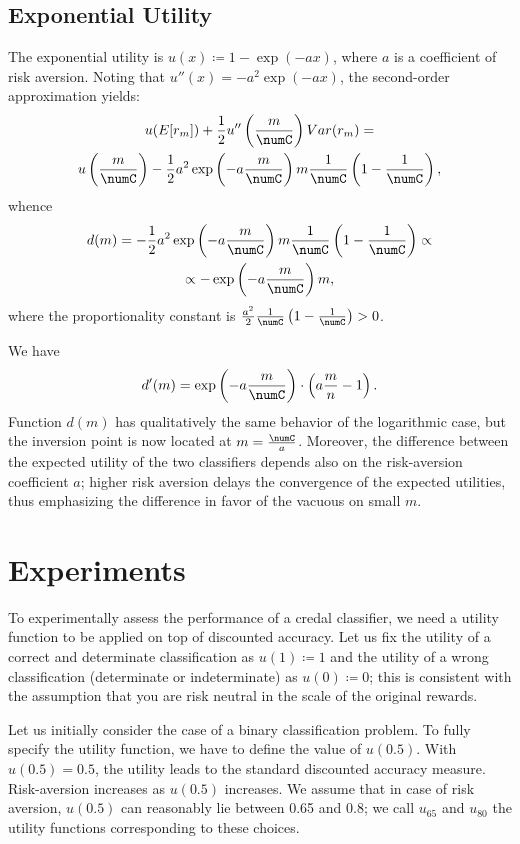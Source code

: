 \documentclass[a4paper,10pt,reqno]{amsart}
\theoremstyle{remark}
\begin{document}
\subsection{Exponential Utility}

The exponential utility is $u(x)\coloneqq 1-\exp(-ax)$, where $a$ is a coefficient of risk aversion. Noting that $u''(x)=-a^2\exp(-ax)$, the second-order approximation yields:
\begin{gather}
 u(E[r_m])+\frac{1}{2}
u''\left(\frac{m}{\numC}\right)Var(r_m)=\nonumber\\
u\left(\frac{m}{\numC}\right)-\frac{1}{2}a^2\exp\left(-a\frac{m}{\numC}\right)
m\frac{1}{\numC} \left(1-\frac{1}{\numC}\right),\notag
\end{gather}
whence
\begin{gather}
d(m)=-\frac{1}{2}a^2\exp\left(-a\frac{m}{\numC}\right)m\frac{1}{\numC}\left(1-\frac{1}{\numC}\right)\propto\nonumber\\
\propto-\exp\left(-a\frac{m}{\numC}\right)m,\notag
\end{gather}
where the proportionality constant is $\frac{a^2}{2}\frac{1}{\numC}\left(1-\frac{1}{\numC}\right)>0$.

We have
\begin{align}
d'(m)=\exp\left(-a\frac{m}{\numC}\right)\cdot \left( a\frac{m}{n}-1\right).\notag%
\end{align}
Function $d(m)$ has qualitatively the same behavior of the logarithmic case, but the inversion point is now located at $m=\frac{\numC}{a}$.
Moreover, the difference between the expected utility of the two classifiers depends also on the risk-aversion coefficient $a$; higher risk aversion delays the convergence of the expected utilities, thus emphasizing the difference in favor of the vacuous on small $m$.

\section{Experiments}\label{sec:expartif}
To experimentally assess the performance of a credal classifier, we need a utility function to be applied on top of discounted accuracy. Let us fix the utility of a correct and determinate classification as $u(1)\coloneqq 1$ and the utility of a wrong classification (determinate or indeterminate) as $u(0)\coloneqq 0$; this is consistent with the assumption that you are risk neutral in the scale of the original rewards. 

Let us initially consider the case of a binary classification problem. To fully specify the utility function, we have to define the value of $u(0.5)$. With $u(0.5)=0.5$, the utility leads to the standard discounted accuracy measure. Risk-aversion increases as $u(0.5)$ increases.  We assume that in case of risk aversion, $u(0.5)$ can reasonably lie between 0.65 and 0.8;  we call $u_{65}$ and $u_{80}$ the utility functions corresponding to these choices.
\end{document}
